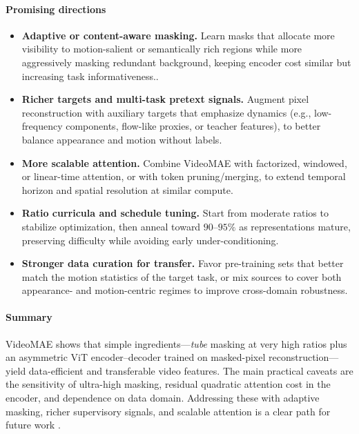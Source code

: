 \begin{enrichment}
\begin{enrichment}
    \paragraph{Promising directions}
    \begin{itemize}
        \item \textbf{Adaptive or content-aware masking.} Learn masks that allocate more visibility to motion-salient or semantically rich regions while more aggressively masking redundant background, keeping encoder cost similar but increasing task informativeness..
        \item \textbf{Richer targets and multi-task pretext signals.} Augment pixel reconstruction with auxiliary targets that emphasize dynamics (e.g., low-frequency components, flow-like proxies, or teacher features), to better balance appearance and motion without labels.
        \item \textbf{More scalable attention.} Combine VideoMAE with factorized, windowed, or linear-time attention, or with token pruning/merging, to extend temporal horizon and spatial resolution at similar compute.
        \item \textbf{Ratio curricula and schedule tuning.} Start from moderate ratios to stabilize optimization, then anneal toward $90$--$95\%$ as representations mature, preserving difficulty while avoiding early under-conditioning.
        \item \textbf{Stronger data curation for transfer.} Favor pre-training sets that better match the motion statistics of the target task, or mix sources to cover both appearance- and motion-centric regimes to improve cross-domain robustness.
    \end{itemize}
    
    \paragraph{Summary}
    VideoMAE shows that simple ingredients---\emph{tube} masking at very high ratios plus an asymmetric ViT encoder--decoder trained on masked-pixel reconstruction---yield data-efficient and transferable video features. The main practical caveats are the sensitivity of ultra-high masking, residual quadratic attention cost in the encoder, and dependence on data domain. Addressing these with adaptive masking, richer supervisory signals, and scalable attention is a clear path for future work \cite{tong2022_videomae}.
            
    \end{enrichment}
    

\end{enrichment}
